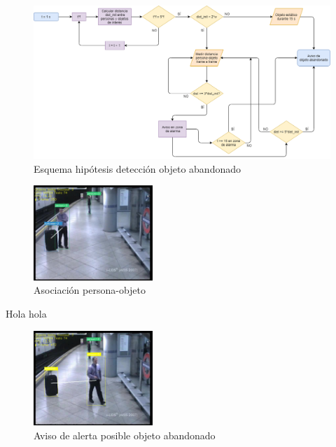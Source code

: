 \begin{figure}[ht]
\centering
\includegraphics[width=1\textwidth]{img/chapters/desarrollo/abandoned-object-scheme.png}
\caption{\label{fig:abandoned-object-scheme}Esquema hipótesis detección objeto abandonado}
\end{figure}

\newpage

\begin{figure}[ht]
\centering
\includegraphics[width=0.4\textwidth]{img/chapters/desarrollo/link-persona-objeto.jpg}
\caption{\label{fig:link-persona-objeto}Asociación persona-objeto}
\end{figure}

Hola hola

\begin{figure}[ht]
\centering
\includegraphics[width=0.4\textwidth]{img/chapters/desarrollo/warning-abandono.jpg}
\caption{\label{fig:warning-abandono}Aviso de alerta posible objeto abandonado}
\end{figure}

